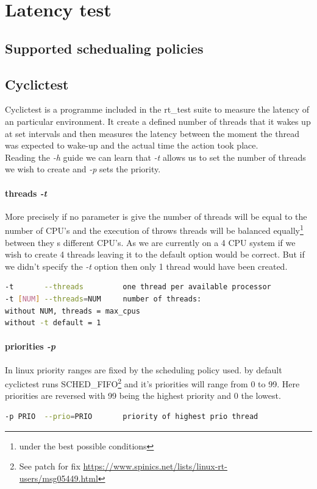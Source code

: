 \documentclass[10pt,a4paper]{article}
\begin{document}
\tableofcontents

\thispagestyle{empty}


\newpage
\section{Latency test}
\subsection{Supported schedualing policies}
\subsection{Cyclictest}
Cyclictest is a programme included in the rt\_test suite to measure the latency of an particular environment. It create a defined number of threads that it wakes up at set intervals and then measures the latency between the moment the thread was expected to wake-up and the actual time the action took place.\\
Reading the \emph{-h} guide we can learn that \emph{-t} allows us to set the number of threads we wish to create and \emph{-p} sets the priority. 
\paragraph{threads \emph{-t}}
More precisely if no parameter is give the number of threads will be equal to the number of CPU's and the execution of throws threads will be balanced equally\footnote{under the best possible conditions} between they s different CPU's. As we are currently on a 4 CPU system if we wish to create 4 threads leaving it to the default option would be correct. But if we didn't specify the \emph{-t} option then only 1 thread would have been created.
\begin{lstlisting}[language=bash,caption={cyclictest -h}]
-t       --threads         one thread per available processor
-t [NUM] --threads=NUM     number of threads:
without NUM, threads = max_cpus
without -t default = 1
\end{lstlisting}
\paragraph{priorities \emph{-p}}
In linux priority ranges are fixed by the scheduling policy used. by default cyclictest runs SCHED\_FIFO\footnote{See patch for fix \url{https://www.spinics.net/lists/linux-rt-users/msg05449.html}} and it's priorities will range from 0 to 99. Here priorities are reversed with 99 being the highest priority and 0 the lowest.
\begin{lstlisting}[language=bash,caption={cyclictest -h}]
-p PRIO  --prio=PRIO       priority of highest prio thread
\end{lstlisting}
\end{document}
